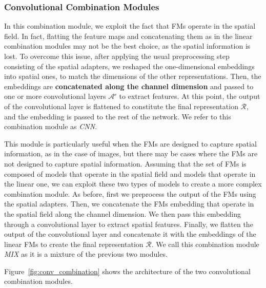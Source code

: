 \subsubsection{Convolutional Combination Modules}
\label{subsubsec:convolutional_combination}
In this combination module, we exploit the fact that FMs operate in the spatial field.
In fact, flatting the feature maps and concatenating them as in the linear combination modules may not be the best choice, as the spatial information is lost.
To overcome this issue, after applying the usual preprocessing step consisting of the spatial adapters, we reshaped the one-dimensional embeddings into spatial ones, to match the dimensions of the other representations.
Then, the embeddings are \textbf{concatenated along the channel dimension} and passed to one or more convolutional layers $\mathcal{A^c}$ to extract features.
At this point, the output of the convolutional layer is flattened to constitute the final representation $\mathcal{R}$, and the embedding is passed to the rest of the network.
We refer to this combination module as \textit{CNN}.

This module is particularly useful when the FMs are designed to capture spatial information, as in the case of images, but there may be cases where the FMs are not designed to capture spatial information.
Assuming that the set of FMs is composed of models that operate in the spatial field and models that operate in the linear one, we can exploit these two types of models to create a more complex combination module.
As before, first we preprocess the output of the FMs using the spatial adapters.
Then, we concatenate the FMs embedding that operate in the spatial field along the channel dimension.
We then pass this embedding through a convolutional layer to extract spatial features.
Finally, we flatten the output of the convolutional layer and concatenate it with the embeddings of the linear FMs to create the final representation $\mathcal{R}$.
We call this combination module \textit{MIX} as it is a mixture of the previous two modules.

Figure~\ref{fig:conv_combination} shows the architecture of the two convolutional combination modules.

